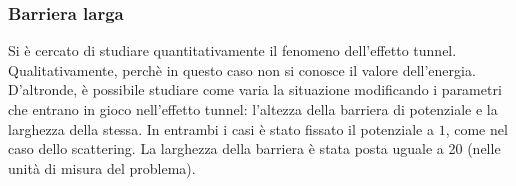  \subsubsection{Barriera larga}
 Si è cercato di studiare quantitativamente il fenomeno dell'effetto tunnel. Qualitativamente, perchè in questo caso non si conosce il valore dell'energia.
 D'altronde, è possibile studiare come varia la situazione modificando i parametri che entrano in gioco nell'effetto tunnel: l'altezza della barriera di potenziale e la larghezza della stessa.
 In entrambi i casi è stato fissato il potenziale a $1$, come nel caso dello scattering.
 La larghezza della barriera è stata posta uguale a 20 (nelle unità di misura del problema).
\begin{figure}[hp]
 \centering

\end{figure}
